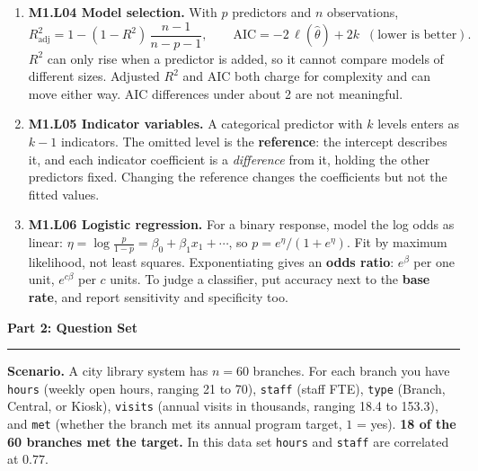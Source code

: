 \documentclass[11pt]{article}
\newcommand{\parttitle}[1]{%
  \par\medskip\noindent
  {\large\bfseries #1}\par
  \vspace{-.5em}\noindent\rule{\linewidth}{0.4pt}\par\smallskip}
\begin{document}
{\begin{enumerate}[label=\textbf{\arabic*.}, wide=0pt, itemsep=.45em, topsep=.5em]
\item \textbf{M1.L04 Model selection.} With $p$ predictors and $n$ observations,
\[
R^2_{\text{adj}} = 1 - (1-R^2)\,\frac{n-1}{n-p-1},
\qquad
\text{AIC} = -2\,\ell(\hat\theta) + 2k \;\; (\text{lower is better}).
\]
$R^2$ can only rise when a predictor is added, so it cannot compare models of different sizes.
Adjusted $R^2$ and AIC both charge for complexity and can move either way. AIC differences under
about 2 are not meaningful.

\item \textbf{M1.L05 Indicator variables.} A categorical predictor with $k$ levels enters as
$k-1$ indicators. The omitted level is the \textbf{reference}: the intercept describes it, and
each indicator coefficient is a \emph{difference} from it, holding the other predictors fixed.
Changing the reference changes the coefficients but not the fitted values.

\item \textbf{M1.L06 Logistic regression.} For a binary response, model the log odds as linear:
$\eta = \log\frac{p}{1-p} = \beta_0 + \beta_1x_1 + \cdots$, so
$p = e^{\eta}/(1+e^{\eta})$. Fit by maximum likelihood, not least squares. Exponentiating gives an
\textbf{odds ratio}: $e^{\beta}$ per one unit, $e^{c\beta}$ per $c$ units. To judge a classifier,
put accuracy next to the \textbf{base rate}, and report sensitivity and specificity too.

\end{enumerate}

}

\newpage

\parttitle{Part 2: Question Set}

\noindent\textbf{Scenario.} A city library system has $n = 60$ branches. For each branch you have
\texttt{hours} (weekly open hours, ranging 21 to 70), \texttt{staff} (staff FTE),
\texttt{type} (Branch, Central, or Kiosk), \texttt{visits} (annual visits in thousands, ranging
18.4 to 153.3), and \texttt{met} (whether the branch met its annual program target, $1$ = yes).
\textbf{18 of the 60 branches met the target.} In this data set \texttt{hours} and \texttt{staff}
are correlated at $0.77$.
\end{document}
